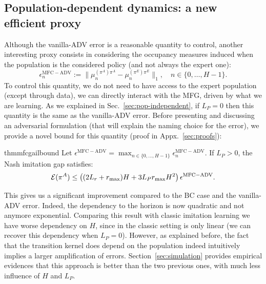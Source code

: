 \documentclass{article}
\begin{document}
\subsection{Population-dependent dynamics: a new efficient proxy}
\label{sec:pop-dependent-sol}
Although the vanilla-ADV error is a reasonable quantity to control, another interesting proxy consists in considering the occupancy measures induced when the population is the considered policy (and not always the expert one):
\begin{equation}
\epsilon_n^{\mathrm{MFC-ADV}} := \|\mu_n^{(\pi^A)\pi^A}-\mu_n^{(\pi^E)\pi^E}\|_1, \quad n\in\{0,\dots,H-1\}.
\end{equation}
To control this quantity, we do not need to have access to the expert population (except through data), we can directly interact with the MFG, driven by what we are learning. 
As we explained in Sec.~\ref{sec:pop-independent}, if $L_P=0$ then this quantity is the same as the vanilla-ADV error.
Before presenting and discussing an adversarial formulation (that will explain the naming choice for the error), we provide a novel bound for this quantity (proof in Appx.~\ref{sec:proofs}):
\begin{restatable}{thm}{mfcgailbound}
Let
$\epsilon^{\mathrm{MFC-ADV}} = \max_{n\in\{0,\dots,H-1\}}\epsilon^{\mathrm{MFC-ADV}}_n$.
If $L_P>0$, the Nash imitation gap satisfies:
\begin{equation}
\mathcal{E}(\pi^{A})\le\left((2L_{r}+r_{\max})H+3L_{P}r_{\max}H^{2}\right)\epsilon^{\mathrm{MFC-ADV}}.
\end{equation}
\end{restatable}
This gives us a significant improvement compared to the BC case and the vanilla-ADV error. Indeed, the dependency to the horizon is now quadratic and not anymore exponential. Comparing this result with classic imitation learning we have worse dependency on $H$, since in the classic setting is only linear (we can recover this dependency when $L_P = 0$). However, as explained before, the fact that the transition kernel does depend on the population indeed intuitively implies a larger amplification of errors. Section~\ref{sec:simulation} provides empirical evidences that this approach is better than the two previous ones, with much less influence of $H$ and $L_P$.
\end{document}
